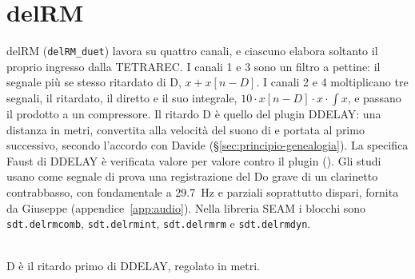 \chapter{delRM}\label{cap:delrm}
delRM (\texttt{delRM\_duet}) lavora su quattro canali, e ciascuno elabora soltanto il proprio ingresso dalla TETRAREC.
I canali 1 e 3 sono un filtro a pettine: il segnale più se stesso ritardato di D, $x + x[n-D]$.
I canali 2 e 4 moltiplicano tre segnali, il ritardato, il diretto e il suo integrale, $10 \cdot x[n-D] \cdot x \cdot \int x$, e passano il prodotto a un compressore.
Il ritardo D è quello del plugin DDELAY: una distanza in metri, convertita alla velocità del suono di  e portata al primo successivo, secondo l'accordo con Davide (\S\ref{sec:principio-genealogia}).
La specifica Faust di DDELAY è verificata valore per valore contro il plugin ().
Gli studi usano come segnale di prova una registrazione del Do grave di un clarinetto contrabbasso, con fondamentale a \qty{29.7}{\hertz} e parziali soprattutto dispari, fornita da Giuseppe (appendice~\ref{app:audio}).
Nella libreria SEAM i blocchi sono \texttt{sdt.delrmcomb}, \texttt{sdt.delrmint}, \texttt{sdt.delrmrm} e \texttt{sdt.delrmdyn}.

\begin{center}
\\[1mm]
{\small D è il ritardo primo di DDELAY, regolato in metri.}
\end{center}

